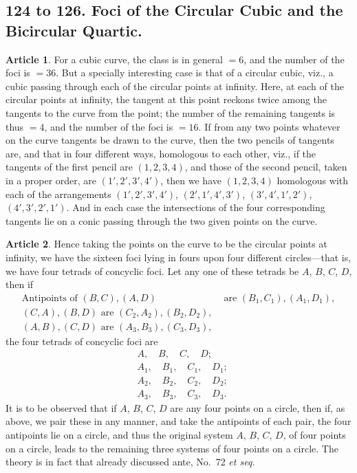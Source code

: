 \documentclass[11pt,a4paper]{article}
\theoremstyle{definition}
\newtheorem{art}{Article}
\begin{document}
\subsection*{124 to 126. Foci of the Circular Cubic and the Bicircular Quartic.}

\begin{art}
For a cubic curve, the class is in general $= 6$, and the number of the foci is $= 36$. But a specially interesting case is that of a circular cubic, viz., a cubic passing through each of the circular points at infinity. Here, at each of the circular points at infinity, the tangent at this point reckons twice among the tangents to the curve from the point; the number of the remaining tangents is thus $= 4$, and the number of the foci is $= 16$. If from any two points whatever on the curve tangents be drawn to the curve, then the two pencils of tangents are, and that in four different ways, homologous to each other, viz., if the tangents of the first pencil are $(1, 2, 3, 4)$, and those of the second pencil, taken in a proper order, are $(1', 2', 3', 4')$, then we have $(1, 2, 3, 4)$ homologous with each of the arrangements $(1', 2', 3', 4')$, $(2', 1', 4', 3')$, $(3', 4', 1', 2')$, $(4', 3', 2', 1')$. And in each case the intersections of the four corresponding tangents lie on a conic passing through the two given points on the curve.
\end{art}

\begin{art}
Hence taking the points on the curve to be the circular points at infinity, we have the sixteen foci lying in fours upon four different circles---that is, we have four tetrads of concyclic foci. Let any one of these tetrads be $A$, $B$, $C$, $D$, then if
\begin{align*}
\text{Antipoints of } (B, C), (A, D) &\text{ are } (B_{1}, C_{1}), (A_{1}, D_{1}), \\
(C, A), (B, D) \text{ are } (C_{2}, A_{2}), (B_{2}, D_{2}), \\
(A, B), (C, D) \text{ are } (A_{3}, B_{3}), (C_{3}, D_{3}),
\end{align*}
the four tetrads of concyclic foci are
\begin{align*}
& A, \quad B, \quad C, \quad D; \\
& A_{1}, \quad B_{1}, \quad C_{1}, \quad D_{1}; \\
& A_{2}, \quad B_{2}, \quad C_{2}, \quad D_{2}; \\
& A_{3}, \quad B_{3}, \quad C_{3}, \quad D_{3}.
\end{align*}
It is to be observed that if $A$, $B$, $C$, $D$ are any four points on a circle, then if, as above, we pair these in any manner, and take the antipoints of each pair, the four antipoints lie on a circle, and thus the original system $A$, $B$, $C$, $D$, of four points on a circle, leads to the remaining three systems of four points on a circle. The theory is in fact that already discussed ante, No.\ 72 \textit{et seq.}
\end{art}
\end{document}
